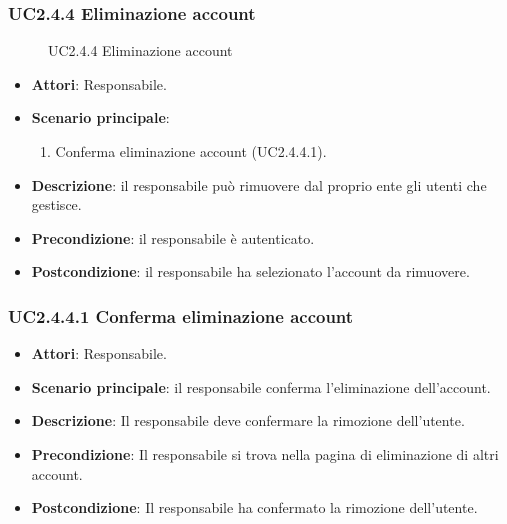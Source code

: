 \subsubsection{UC2.4.4 Eliminazione account}
\begin{figure}[H]
\centering
\noindent{}
\caption{UC2.4.4 Eliminazione account}
\end{figure}
\begin{itemize}
\item \textbf{Attori}: Responsabile.
\item \textbf{Scenario principale}:
\begin{enumerate}
\item Conferma eliminazione account (UC2.4.4.1).
\end{enumerate}
\item \textbf{Descrizione}: il responsabile può rimuovere dal proprio ente gli utenti che gestisce.
\item \textbf{Precondizione}: il responsabile è autenticato.
\item \textbf{Postcondizione}: il responsabile ha selezionato l'account da rimuovere.
\end{itemize}
\subsubsection{UC2.4.4.1 Conferma eliminazione account}
\begin{itemize}
\item \textbf{Attori}: Responsabile.
\item \textbf{Scenario principale}: il responsabile conferma l'eliminazione dell'account.
\item \textbf{Descrizione}: Il responsabile deve confermare la rimozione dell'utente.
\item \textbf{Precondizione}: Il responsabile si trova nella pagina di eliminazione di altri account.
\item \textbf{Postcondizione}: Il responsabile ha confermato la rimozione  dell'utente.
\end{itemize}
